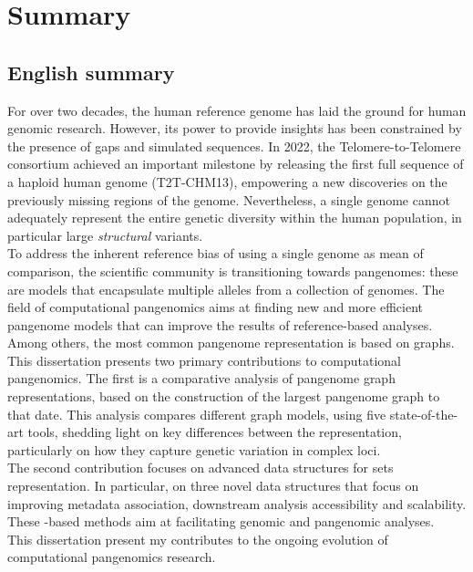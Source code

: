  \chapter{Summary}
\label{sec:Summary}
\section{English summary}
For over two decades, the human reference genome has laid the ground for human genomic research. However, its power to provide insights has been constrained by the presence of gaps and simulated sequences. In 2022, the Telomere-to-Telomere consortium achieved an important milestone by releasing the first full sequence of a haploid human genome (T2T-CHM13), empowering a new discoveries on the previously missing regions of the genome. Nevertheless, a single genome cannot adequately represent the entire genetic diversity within the human population, in particular large \emph{structural} variants.\\
To address the inherent reference bias of using a single genome as mean of comparison, the scientific community is transitioning towards pangenomes: these are models that encapsulate multiple alleles from a collection of genomes. The field of computational pangenomics aims at finding new and more efficient pangenome models that can improve the results of reference-based analyses. Among others, the most common pangenome representation is based on graphs. \\
This dissertation presents two primary contributions to computational pangenomics. The first is a comparative analysis of pangenome graph representations, based on the construction of the largest pangenome graph to that date. This analysis compares different graph models, using five state-of-the-art tools, shedding light on key differences between the representation, particularly on how they capture genetic variation in complex loci.\\
The second contribution focuses on advanced data structures for \kmer sets representation. In particular, on three novel data structures that focus on improving metadata association, downstream analysis accessibility and scalability. These \kmer-based methods aim at facilitating genomic and pangenomic analyses.\\
This dissertation present my contributes to the ongoing evolution of computational pangenomics research.
